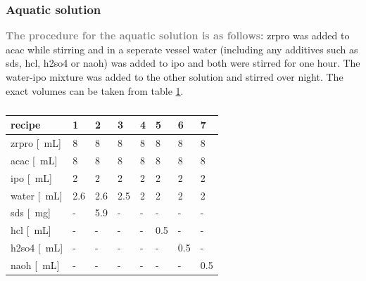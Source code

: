 \documentclass[a4paper]{article}
\newcommand{\me}[1]{\textbf{\textcolor{gray}{#1}}}
\newcommand{\mg}[1]{\SI{#1}{\milli\gram}}
\newcommand{\ml}[1]{\SI{#1}{\milli\liter}}
\begin{document}
\subsubsection{Aquatic solution}
\me{The procedure for the aquatic solution is as follows:}
\gls{zrpro} was added to \gls{acac} while stirring and in a seperate vessel \gls{water} (including any additives such as \gls{sds}, \gls{hcl}, \gls{h2so4} or \gls{naoh}) was added to \gls{ipo} and both were stirred for one hour. 
The \gls{water}-\gls{ipo} mixture was added to the other solution and stirred over night. 
The exact volumes can be taken from table \ref{tab:rec1}.
\begin{table}[h]
	\centering
	\caption{}
	\label{tab:rec1}
	\begin{tabular}{llllllll}
		\hline
		recipe				&1		&2		&3		&4		&5		&6		&7\\
		\hline
		\gls{zrpro} [\ml{}]	&8		&8		&8		&8		&8		&8		&8\\
		\gls{acac}  [\ml{}]	&8		&8		&8		&8		&8		&8		&8\\
		\gls{ipo}   [\ml{}]	&2		&2		&2		&2		&2		&2		&2\\
		\gls{water} [\ml{}]	&2.6	&2.6	&2.5	&2		&2		&2		&2\\
		\gls{sds}   [\mg{}]	&-		&5.9	&-		&-		&-		&-		&-\\
		\gls{hcl}   [\ml{}]	&-		&-		&-		&-		&0.5	&-		&-\\
		\gls{h2so4} [\ml{}]	&-		&-		&-		&-		&-		&0.5	&-\\
		\gls{naoh}  [\ml{}] &-		&-		&-		&-		&-		&-		&0.5\\
		\hline
	\end{tabular}
\end{table}
%
\end{document}
